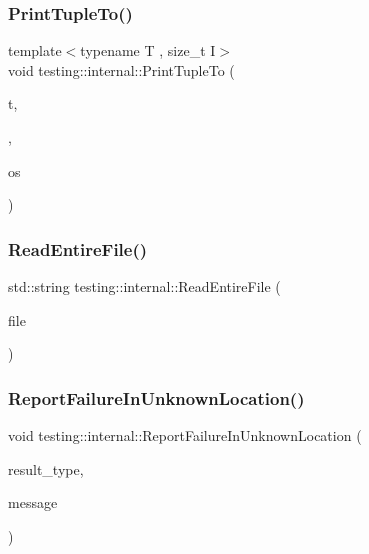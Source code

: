 \mbox{\label{namespacetesting_1_1internal_a3580971ab4571dc9a00f4ed0e17fd777}} 
\subsubsection{\texorpdfstring{PrintTupleTo()}{PrintTupleTo()}\hspace{0.1cm}{\footnotesize\ttfamily [2/2]}}
{\footnotesize\ttfamily template$<$typename T , size\+\_\+t I$>$ \\
void testing\+::internal\+::\+Print\+Tuple\+To (\begin{DoxyParamCaption}\item[{const T \&}]{t,  }\item[{std\+::integral\+\_\+constant$<$ size\+\_\+t, I $>$}]{,  }\item[{\+::std\+::ostream $\ast$}]{os }\end{DoxyParamCaption})}

\mbox{\label{namespacetesting_1_1internal_a2cc0be60c54a8701423fe5297e1349ee}} 
\subsubsection{\texorpdfstring{ReadEntireFile()}{ReadEntireFile()}}
{\footnotesize\ttfamily std\+::string testing\+::internal\+::\+Read\+Entire\+File (\begin{DoxyParamCaption}\item[{F\+I\+LE $\ast$}]{file }\end{DoxyParamCaption})}

\mbox{\label{namespacetesting_1_1internal_a85f6ff0e40f9a5f10af66a73cf1364fa}} 
\subsubsection{\texorpdfstring{ReportFailureInUnknownLocation()}{ReportFailureInUnknownLocation()}}
{\footnotesize\ttfamily void testing\+::internal\+::\+Report\+Failure\+In\+Unknown\+Location (\begin{DoxyParamCaption}\item[{Test\+Part\+Result\+::\+Type}]{result\+\_\+type,  }\item[{const std\+::string \&}]{message }\end{DoxyParamCaption})}

